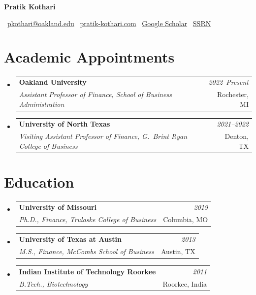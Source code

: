 \documentclass[letterpaper,11pt]{article}
\makeatletter
\newcommand{\sectionspacing}{\vspace{-2mm}}
\newcommand{\resumeSubheading}[4]{
\vspace{0.5mm}\item
    \begin{tabular*}{0.98\textwidth}[t]{l@{\extracolsep{\fill}}r}
        \textbf{#1} & \textit{\footnotesize{#4}} \\
        \textit{\footnotesize{#3}} &  \footnotesize{#2}\\
    \end{tabular*}
    \vspace{-2.4mm}
}
\newcommand{\resumeSubHeadingListStart}{\begin{itemize}[leftmargin=*,labelsep=1mm]}
\newcommand{\resumeSubHeadingListEnd}{\end{itemize}\vspace{2mm}}
\newcommand{\headerfontiii}{\fontfamily{ppl}\selectfont}
\makeatother
\begin{document}
\headerfontiii
\thispagestyle{empty}

\begin{center}
    {\Huge\textbf{Pratik Kothari}}
\end{center}
\vspace{-4mm}

\begin{center}
    \small{
    ~\href{mailto:pkothari@oakland.edu}{pkothari@oakland.edu} \quad
    ~\href{https://pratik-kothari.com}{pratik-kothari.com} \quad
    ~\href{https://scholar.google.com/citations?user=ttBn_mQAAAAJ&hl}{Google Scholar} \quad
    ~\href{https://papers.ssrn.com/sol3/cf_dev/AbsByAuth.cfm?per_id=2277546}{SSRN}
    }
\end{center}
\vspace{-4mm}

\section{\textbf{Academic Appointments}}
\vspace{-0.4mm}
\resumeSubHeadingListStart
\resumeSubheading
    {Oakland University}{Rochester, MI}
    {Assistant Professor of Finance, School of Business Administration}{2022--Present}
\resumeSubheading
    {University of North Texas}{Denton, TX}
    {Visiting Assistant Professor of Finance, G.\ Brint Ryan College of Business}{2021--2022}
\resumeSubHeadingListEnd
\sectionspacing
\section{\textbf{Education}}
\vspace{-0.4mm}
\resumeSubHeadingListStart
\resumeSubheading
    {University of Missouri}{Columbia, MO}
    {Ph.D., Finance, Trulaske College of Business}{2019}
\resumeSubheading
    {University of Texas at Austin}{Austin, TX}
    {M.S., Finance, McCombs School of Business}{2013}
\resumeSubheading
    {Indian Institute of Technology Roorkee}{Roorkee, India}
    {B.Tech., Biotechnology}{2011}
\resumeSubHeadingListEnd
\sectionspacing
\end{document}
